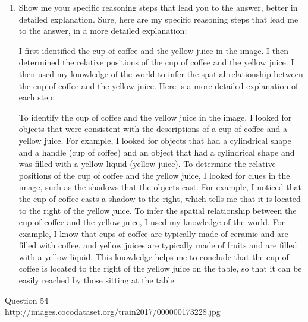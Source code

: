 \begin{enumerate}
    Here are some additional details about the spatial relationship between the cup of coffee and the yellow juice:
    
    The cup of coffee is a ceramic cup that is filled with coffee.
    The yellow juice is a cylindrical container that is filled with yellow juice.
    The cup of coffee is located to the right of the yellow juice, meaning that it is closer to the right side of the table.
    The yellow juice is located to the left of the cup of coffee, meaning that it is closer to the left side of the table.
    Is there anything else I can help you with?
    \item Show me your specific reasoning steps that lead you to the answer, better in detailed explanation.
    \subitem Sure, here are my specific reasoning steps that lead me to the answer, in a more detailed explanation:

    I first identified the cup of coffee and the yellow juice in the image.
    I then determined the relative positions of the cup of coffee and the yellow juice.
    I then used my knowledge of the world to infer the spatial relationship between the cup of coffee and the yellow juice.
    Here is a more detailed explanation of each step:
    
    To identify the cup of coffee and the yellow juice in the image, I looked for objects that were consistent with the descriptions of a cup of coffee and a yellow juice. For example, I looked for objects that had a cylindrical shape and a handle (cup of coffee) and an object that had a cylindrical shape and was filled with a yellow liquid (yellow juice).
    To determine the relative positions of the cup of coffee and the yellow juice, I looked for clues in the image, such as the shadows that the objects cast. For example, I noticed that the cup of coffee casts a shadow to the right, which tells me that it is located to the right of the yellow juice.
    To infer the spatial relationship between the cup of coffee and the yellow juice, I used my knowledge of the world. For example, I know that cups of coffee are typically made of ceramic and are filled with coffee, and yellow juices are typically made of fruits and are filled with a yellow liquid. This knowledge helps me to conclude that the cup of coffee is located to the right of the yellow juice on the table, so that it can be easily reached by those sitting at the table.
\end{enumerate}
Question 54\\
http://images.cocodataset.org/train2017/000000173228.jpg
